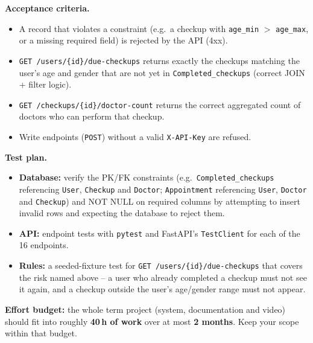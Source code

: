 \documentclass[11pt,a4paper]{article}
\begin{document}
\textbf{Acceptance criteria.}
\begin{itemize}[topsep=2pt]
  \item A record that violates a constraint (e.g.\ a checkup with
        \texttt{age\_min} $>$ \texttt{age\_max}, or a missing required field)
        is rejected by the API (4xx).
  \item \texttt{GET /users/\{id\}/due-checkups} returns exactly the checkups
        matching the user's age and gender that are not yet in
        \texttt{Completed\_checkups} (correct JOIN + filter logic).
  \item \texttt{GET /checkups/\{id\}/doctor-count} returns the correct
        aggregated count of doctors who can perform that checkup.
  \item Write endpoints (\texttt{POST}) without a valid \texttt{X-API-Key}
        are refused.
\end{itemize}

\textbf{Test plan.}
\begin{itemize}[topsep=2pt]
  \item \textbf{Database:} verify the PK/FK constraints (e.g.\
        \texttt{Completed\_checkups} referencing \texttt{User},
        \texttt{Checkup} and \texttt{Doctor}; \texttt{Appointment}
        referencing \texttt{User}, \texttt{Doctor} and \texttt{Checkup}) and
        NOT NULL on required columns by attempting to insert invalid rows
        and expecting the database to reject them.
  \item \textbf{API:} endpoint tests with \texttt{pytest} and FastAPI's
        \texttt{TestClient} for each of the 16 endpoints. 
  \item \textbf{Rules:} a seeded-fixture test for
        \texttt{GET /users/\{id\}/due-checkups} that covers the risk named
        above -- a user who already completed a checkup must not see it
        again, and a checkup outside the user's age/gender range must not
        appear.
\end{itemize}

\vspace{1em}
\begin{infobox}
\textbf{Effort budget:} the whole term project (system, documentation and video)
should fit into roughly \textbf{40\,h of work} over at most \textbf{2 months}.
Keep your scope within that budget.
\end{infobox}
\end{document}
